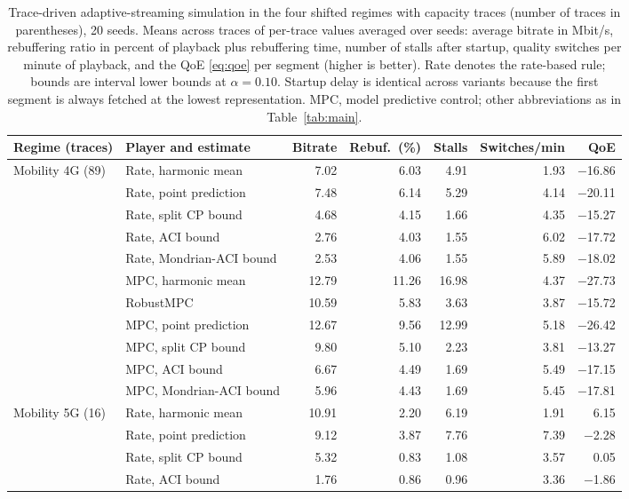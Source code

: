 \begin{table}[!t]
\caption{Trace-driven adaptive-streaming simulation in the four shifted regimes with capacity traces (number of traces in parentheses), 20 seeds. Means across traces of per-trace values averaged over seeds: average bitrate in Mbit/s, rebuffering ratio in percent of playback plus rebuffering time, number of stalls after startup, quality switches per minute of playback, and the QoE \eqref{eq:qoe} per segment (higher is better). Rate denotes the rate-based rule; bounds are interval lower bounds at $\alpha=0.10$. Startup delay is identical across variants because the first segment is always fetched at the lowest representation. MPC, model predictive control; other abbreviations as in Table~\ref{tab:main}.}
\label{tab:has}
\centering
\footnotesize
\begin{tabular}{llrrrrr}
\toprule
Regime (traces) & Player and estimate & Bitrate & Rebuf.\ (\%) & Stalls & Switches/min & QoE \\
\midrule
Mobility 4G (89) & Rate, harmonic mean & 7.02 & 6.03 & 4.91 & 1.93 & $-$16.86 \\
 & Rate, point prediction & 7.48 & 6.14 & 5.29 & 4.14 & $-$20.11 \\
 & Rate, split CP bound & 4.68 & 4.15 & 1.66 & 4.35 & $-$15.27 \\
 & Rate, ACI bound & 2.76 & 4.03 & 1.55 & 6.02 & $-$17.72 \\
 & Rate, Mondrian-ACI bound & 2.53 & 4.06 & 1.55 & 5.89 & $-$18.02 \\
 & MPC, harmonic mean & 12.79 & 11.26 & 16.98 & 4.37 & $-$27.73 \\
 & RobustMPC & 10.59 & 5.83 & 3.63 & 3.87 & $-$15.72 \\
 & MPC, point prediction & 12.67 & 9.56 & 12.99 & 5.18 & $-$26.42 \\
 & MPC, split CP bound & 9.80 & 5.10 & 2.23 & 3.81 & $-$13.27 \\
 & MPC, ACI bound & 6.67 & 4.49 & 1.69 & 5.49 & $-$17.15 \\
 & MPC, Mondrian-ACI bound & 5.96 & 4.43 & 1.69 & 5.45 & $-$17.81 \\
\midrule
Mobility 5G (16) & Rate, harmonic mean & 10.91 & 2.20 & 6.19 & 1.91 & 6.15 \\
 & Rate, point prediction & 9.12 & 3.87 & 7.76 & 7.39 & $-$2.28 \\
 & Rate, split CP bound & 5.32 & 0.83 & 1.08 & 3.57 & 0.05 \\
 & Rate, ACI bound & 1.76 & 0.86 & 0.96 & 3.36 & $-$1.86 \\

\end{tabular}
\end{table}
